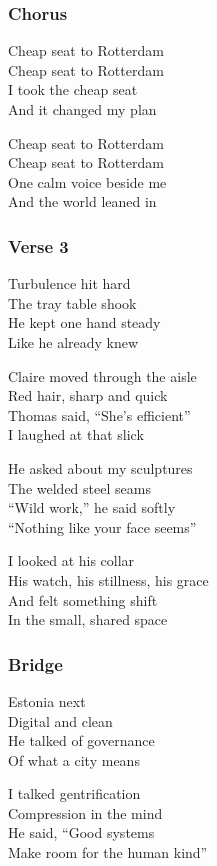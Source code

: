 \subsubsection{Chorus}\label{chorus-62}

Cheap seat to Rotterdam\\
Cheap seat to Rotterdam\\
I took the cheap seat\\
And it changed my plan

Cheap seat to Rotterdam\\
Cheap seat to Rotterdam\\
One calm voice beside me\\
And the world leaned in

\subsubsection{Verse 3}\label{verse-3-11}

Turbulence hit hard\\
The tray table shook\\
He kept one hand steady\\
Like he already knew

Claire moved through the aisle\\
Red hair, sharp and quick\\
Thomas said, ``She's efficient''\\
I laughed at that slick

He asked about my sculptures\\
The welded steel seams\\
``Wild work,'' he said softly\\
``Nothing like your face seems''

I looked at his collar\\
His watch, his stillness, his grace\\
And felt something shift\\
In the small, shared space

\subsubsection{Bridge}\label{bridge-23}

Estonia next\\
Digital and clean\\
He talked of governance\\
Of what a city means

I talked gentrification\\
Compression in the mind\\
He said, ``Good systems\\
Make room for the human kind''

